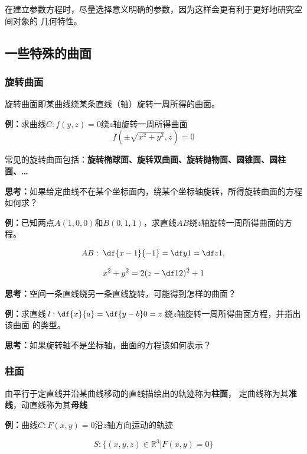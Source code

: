 在建立参数方程时，尽量选择意义明确的参数，因为这样会更有利于更好地研究空间对象的
几何特性。

\subsection{一些特殊的曲面}

\subsubsection{旋转曲面}

旋转曲面即某曲线绕某条直线（轴）旋转一周所得的曲面。

{\bf 例：}求曲线$C:f(y,z)=0$绕$z$轴旋转一周所得曲面
$${f(\pm\sqrt{x^2+y^2},z)=0}$$

常见的旋转曲面包括：{\bf 旋转椭球面、旋转双曲面、旋转抛物面、圆锥面、圆柱面、\ldots}

{\bf 思考：}如果给定曲线不在某个坐标面内，绕某个坐标轴旋转，所得旋转曲面的方程如何求？

{\bf 例：}已知两点$A(1,0,0)$和$B(0,1,1)$，求直线$AB$绕$z$轴旋转一周所得曲面的方程。

$$AB:\;\df{x-1}{-1}=\df y1=\df z1,$$

$$x^2+y^2=2(z-\df12)^2+1$$

{\bf 思考：}空间一条直线绕另一条直线旋转，可能得到怎样的曲面？

{\bf 例：}求直线$l:\df{x}{a}=\df{y-b}0=z$绕$z$轴旋转一周所得曲面方程，并指出该曲面
的类型。

{\bf 思考：}如果旋转轴不是坐标轴，曲面的方程该如何表示？

\subsubsection{柱面}

由平行于定直线并沿某曲线移动的直线描绘出的轨迹称为{\bf 柱面}，
定曲线称为其{\bf 准线}，动直线称为其{\bf 母线}

{\bf 例：}曲线$C:F(x,y)=0$沿$z$轴方向运动的轨迹

$${S:\{(x,y,z)\in\mathbb{R}^3|F(x,y)=0\}}$$

\begin{center}
\end{center}

